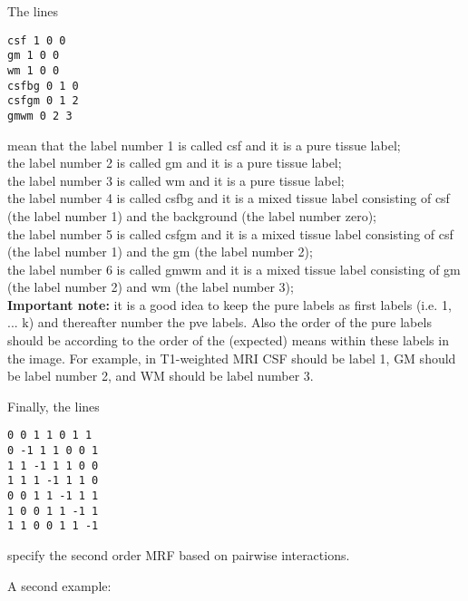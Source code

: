 \documentclass[12pt]{article}
\begin{document}
The lines 
\begin{verbatim}
csf 1 0 0
gm 1 0 0
wm 1 0 0
csfbg 0 1 0
csfgm 0 1 2
gmwm 0 2 3
\end{verbatim}
mean that 
the label number 1 is called csf and it is a pure tissue label; \\
the label number 2 is called gm and it is a pure tissue label; \\
the label number 3 is called wm and it is a pure tissue label; \\
the label number 4 is called csfbg and it is a mixed tissue label
consisting of csf (the label number 1) and the background (the label
number zero);\\
the label number 5 is called csfgm and it is a mixed tissue label
consisting of csf (the label number 1) and the gm (the label
number 2);\\
the label number 6 is called gmwm and it is a mixed tissue label
consisting of gm (the label number 2) and wm (the label
number 3); \\
{\bf Important note:} it is a good idea to keep the pure labels as first labels (i.e. 1,
... k) and thereafter number the pve labels. Also the order of the
pure labels should be according to the order of the (expected) means
within these labels in the image. For example, in T1-weighted MRI CSF
should be label 1, GM should be label number 2, and WM should be label number 3.

Finally, the lines 
\begin{verbatim}
0 0 1 1 0 1 1
0 -1 1 1 0 0 1
1 1 -1 1 1 0 0
1 1 1 -1 1 1 0
0 0 1 1 -1 1 1
1 0 0 1 1 -1 1
1 1 0 0 1 1 -1
\end{verbatim}
specify the second order MRF based on pairwise interactions. 

A second example:
\end{document}

